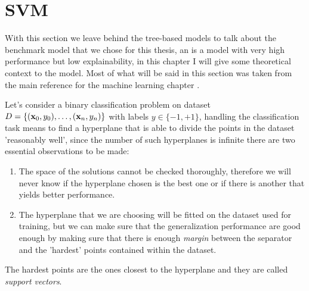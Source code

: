 
\section{SVM}
\label{sec:svm}
With this section we leave behind the tree-based models to talk about the benchmark model that we
chose for this thesis, an \svm is a model with very high performance but low explainability, in this
chapter I will give some theoretical context to the model. Most of what will be said in this section
was taken from the main reference for the machine learning chapter \cite{ZhouZhi-Hua2021ML}.

\medskip

Let's consider a binary classification problem on dataset $D = \{(\mathbf{x}_0, y_0), \ldots, (\mathbf{x}_n, y_n)\}$ with labels $y \in \{-1, +1\}$,
handling the classification task means to find a hyperplane that is able to divide the points in the
dataset 'reasonably well', since the number of such hyperplanes is infinite there are two
essential observations to be made:
\begin{enumerate}
	\item The space of the solutions cannot be checked thoroughly, therefore we will never know
	      if the hyperplane chosen is the best one or if there is another that yields better
	      performance.
	\item The hyperplane that we are choosing will be fitted on the dataset used for training,
	      but we can make sure that the generalization performance are good enough by making
	      sure that there is enough \emph{margin} between the separator and the 'hardest'
	      points contained within the dataset.
\end{enumerate}
The hardest points are the ones closest to the hyperplane and they are called \emph{support
	vectors}.

\medskip

